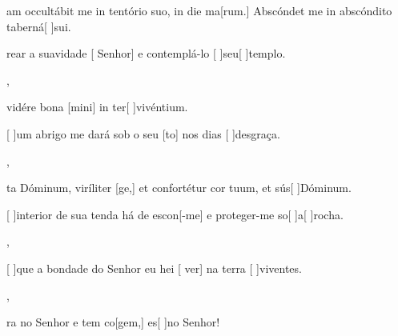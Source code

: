 {  {\item {}am occultábit me in tentório suo, in die ma[\-rum.] Abscóndet me in abscóndito taberná[ ]{su}i.~\Antiphona}%
    {\item {}rear a suavidade [ Senhor] e contemplá-lo [ ]{seu}[ ]{tem}plo.~\Antiphona},
  {\item {} vidére bona [mini] in ter[ ]{vi}{vén}tium.~\Antiphona}%
    {\item {}[ ]{um} abrigo me dará sob o seu [to] nos dias [ ]{des}{gra}ça.~\Antiphona},
  {\item {}ta Dóminum, viríliter [ge,] et confor\-té\-tur cor tu\-um, et sús[ ]{Dó}minum.~\Antiphona}%
    {\item {}[ ]{in}terior de sua tenda há de escon[-me] e proteger-me so[ ]{a}[ ]{ro}cha.~\Antiphona},
  {~\Antiphona}%
    {\item {}[ ]{que} a bondade do Senhor eu hei [ ver] na terra [ ]{vi}{ven}tes.~\Antiphona},
  {~\Antiphona}%
    {\item {}ra no Senhor e tem co[gem,] es[ ]{no} Senhor!~\Antiphona}
}
